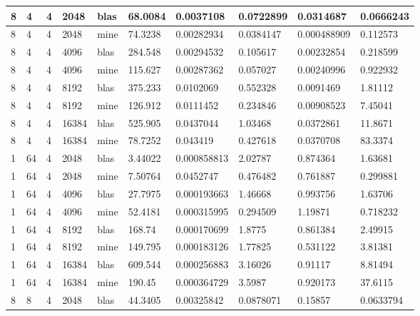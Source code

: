 \documentclass{article}
\begin{document}
\begin{table}[]
{\begin{tabular}{|l|l|l|l|l|l|l|l|l|l|}
8       & 4         & 4     & 2048  & blas & 68.0084 & 0.0037108   & 0.0722899  & 0.0314687   & 0.0666243 \\ \hline
8       & 4         & 4     & 2048  & mine & 74.3238 & 0.00282934  & 0.0384147  & 0.000488909 & 0.112573  \\ \hline
8       & 4         & 4     & 4096  & blas & 284.548 & 0.00294532  & 0.105617   & 0.00232854  & 0.218599  \\ \hline
8       & 4         & 4     & 4096  & mine & 115.627 & 0.00287362  & 0.057027   & 0.00240996  & 0.922932  \\ \hline
8       & 4         & 4     & 8192  & blas & 375.233 & 0.0102069   & 0.552328   & 0.0091469   & 1.81112   \\ \hline
8       & 4         & 4     & 8192  & mine & 126.912 & 0.0111452   & 0.234846   & 0.00908523  & 7.45041   \\ \hline
8       & 4         & 4     & 16384 & blas & 525.905 & 0.0437044   & 1.03468    & 0.0372861   & 11.8671   \\ \hline
8       & 4         & 4     & 16384 & mine & 78.7252 & 0.043419    & 0.427618   & 0.0370708   & 83.3374   \\ \hline
1       & 64        & 4     & 2048  & blas & 3.44022 & 0.000858813 & 2.02787    & 0.874364    & 1.63681   \\ \hline
1       & 64        & 4     & 2048  & mine & 7.50764 & 0.0452747   & 0.476482   & 0.761887    & 0.299881  \\ \hline
1       & 64        & 4     & 4096  & blas & 27.7975 & 0.000193663 & 1.46668    & 0.993756    & 1.63706   \\ \hline
1       & 64        & 4     & 4096  & mine & 52.4181 & 0.000315995 & 0.294509   & 1.19871     & 0.718232  \\ \hline
1       & 64        & 4     & 8192  & blas & 168.74  & 0.000170699 & 1.8775     & 0.861384    & 2.49915   \\ \hline
1       & 64        & 4     & 8192  & mine & 149.795 & 0.000183126 & 1.77825    & 0.531122    & 3.81381   \\ \hline
1       & 64        & 4     & 16384 & blas & 609.544 & 0.000256883 & 3.16026    & 0.91117     & 8.81494   \\ \hline
1       & 64        & 4     & 16384 & mine & 190.45  & 0.000364729 & 3.5987     & 0.920173    & 37.6115   \\ \hline
8       & 8         & 4     & 2048  & blas & 44.3405 & 0.00325842  & 0.0878071  & 0.15857     & 0.0633794 \\ \hline

\end{tabular}}
\end{table}
\end{document}
